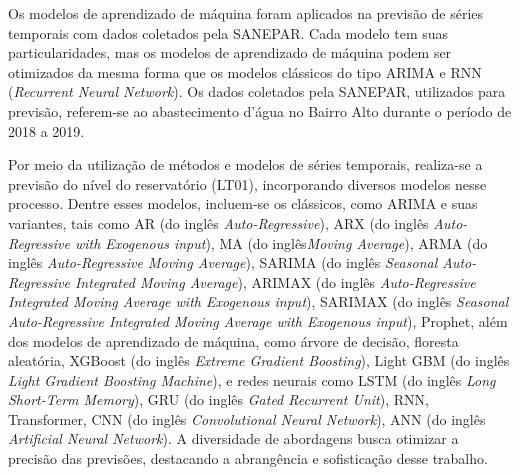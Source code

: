 Os modelos de aprendizado de máquina foram aplicados na previsão de séries temporais com dados coletados pela SANEPAR. Cada modelo tem suas particularidades, mas os modelos de aprendizado de máquina podem ser otimizados da mesma forma que os modelos clássicos do tipo ARIMA e RNN (\textit{Recurrent Neural Network}). Os dados coletados pela SANEPAR, utilizados para previsão, referem-se ao abastecimento d'água no Bairro Alto durante o período de 2018 a 2019.

Por meio da utilização de métodos e modelos de séries temporais, realiza-se a previsão do nível do reservatório (LT01), incorporando diversos modelos nesse processo. Dentre esses modelos, incluem-se os clássicos, como ARIMA e suas variantes, tais como AR (do inglês \textit{Auto-Regressive}), ARX (do inglês \textit{Auto-Regressive with Exogenous input}), MA (do inglês\textit{Moving Average}), ARMA (do inglês \textit{Auto-Regressive Moving Average}), SARIMA (do inglês \textit{Seasonal Auto-Regressive Integrated Moving Average}), ARIMAX (do inglês \textit{Auto-Regressive Integrated Moving Average with Exogenous input}), SARIMAX (do inglês \textit{Seasonal Auto-Regressive Integrated Moving Average with Exogenous input}), Prophet, além dos modelos de aprendizado de máquina, como árvore de decisão, floresta aleatória, XGBoost (do inglês \textit{Extreme Gradient Boosting}), Light GBM (do inglês \textit{Light Gradient Boosting Machine}), e redes neurais como LSTM  (do inglês \textit{Long Short-Term Memory}), GRU (do inglês \textit{Gated Recurrent Unit}), RNN, Transformer, CNN (do inglês \textit{Convolutional Neural Network}), ANN (do inglês \textit{Artificial Neural Network}). A diversidade de abordagens busca otimizar a precisão das previsões, destacando a abrangência e sofisticação desse trabalho.



          

   

    

    

    